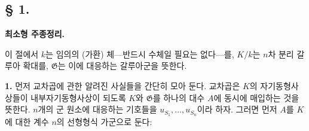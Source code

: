
\subsection*{§ 1.}
\begin{center}
\textbf{최소형 주종정리.}
\end{center}

이 절에서 \(k\)는 임의의 (가환) 체---반드시 수체일 필요는 없다---를, \(K/k\)는 \(n\)차 분리 갈루아 확대를, \(\mathfrak G\)는 이에 대응하는 갈루아군을 뜻한다.

\noindent\textbf{1.} 먼저 교차곱에 관한 알려진 사실들을 간단히 모아 둔다. 교차곱은 \(K\)의 자기동형사상들이 내부자기동형사상이 되도록 \(K\)와 \(\mathfrak G\)를 하나의 대수 \(A\)에 동시에 매입하는 것을 뜻한다. \(n\)개의 군 원소에 대응하는 기호들을 \(u_{S_1},\ldots,u_{S_n}\)이라 하자. 그러면 먼저 \(A\)를 \(K\)에 대한 계수 \(n\)의 선형형식 가군으로 둔다:
